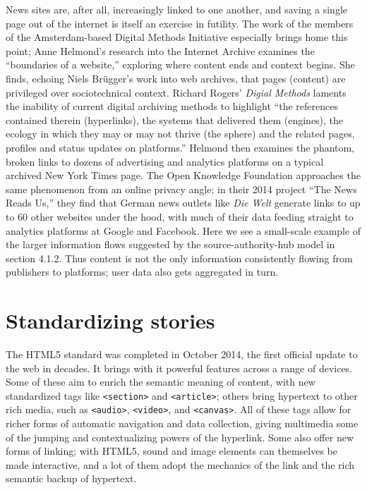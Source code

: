 News sites are, after all, increasingly linked to one another, and saving a single page out of the internet is itself an exercise in futility. The work of the members of the Amsterdam-based Digital Methods Initiative especially brings home this point; Anne Helmond's research into the Internet Archive examines the ``boundaries of a website,'' exploring where content ends and context begins. She finds, echoing Niels Br\"{u}gger's work into web archives, that pages (content) are privileged over sociotechnical context. Richard Rogers' \emph{Digial Methods} laments the inability of current digital archiving methods to highlight ``the references contained therein (hyperlinks), the systems that delivered them (engines), the ecology in which they may or may not thrive (the sphere) and the related pages, profiles and status updates on platforms.''\autocite{helmond_exploring_2013, rogers_digital_2013} Helmond then examines the phantom, broken links to dozens of advertising and analytics platforms on a typical archived New York Times page. The Open Knowledge Foundation approaches the same phenomenon from an online privacy angle; in their 2014 project ``The News Reads Us,'' they find that German news outlets like \emph{Die Welt} generate links to up to 60 other websites under the hood, with much of their data feeding straight to analytics platforms at Google and Facebook.\autocite{wehrmeyer_news_????} Here we see a small-scale example of the larger information flows suggested by the source-authority-hub model in section 4.1.2. Thus content is not the only information consistently flowing from publishers to platforms; user data also gets aggregated in turn.

\section{Standardizing stories}

The HTML5 standard was completed in October 2014, the first official update to the web in decades. It brings with it powerful features across a range of devices. Some of these aim to enrich the semantic meaning of content, with new standardized tags like \texttt{<section>} and \texttt{<article>}; others bring hypertext to other rich media, such as \texttt{<audio>}, \texttt{<video>}, and \texttt{<canvas>}. All of these tags allow for richer forms of automatic navigation and data collection, giving multimedia some of the jumping and contextualizing powers of the hyperlink. Some also offer new forms of linking; with HTML5, sound and image elements can themselves be made interactive, and a lot of them adopt the mechanics of the link and the rich semantic backup of hypertext.

